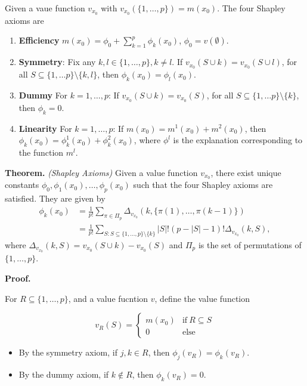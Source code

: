\documentclass[
]{book}
\providecommand{\tightlist}{%
  \setlength{\itemsep}{0pt}\setlength{\parskip}{0pt}}
\begin{document}
Given a vaue function \(v_{x_0}\) with \(v_{x_0}(\{1,\dots,p\})=m(x_0)\). The four Shapley axioms are

\begin{enumerate}
\def\labelenumi{\arabic{enumi}.}
\tightlist
\item
  \textbf{Efficiency} \(m\left(x_0\right)=\phi_{0}+\sum_{k=1}^{p} \phi_k(x_0)\), \(\phi_{0}=v(\emptyset)\).
\item
  \textbf{Symmetry}: Fix any \(k,l \in \{1,\dots,p\}, k\neq l\).
  If \(v_{x_0}(S\cup k)=v_{x_0}(S\cup l)\), for all \(S \subseteq \{1,\dots p\}\setminus \{k,l\}\), then \(\phi_k(x_0)=\phi_l(x_0).\)
\item
  \textbf{Dummy} For \(k=1,\dots,p\): If \(v_{x_0}(S\cup k)=v_{x_0}(S)\), for all \(S \subseteq \{1,\dots p\}\setminus \{k\}\), then \(\phi_k=0.\)
\item
  \textbf{Linearity} For \(k=1,\dots,p\): If \(m(x_0)=m^1(x_0)+m^2(x_0)\), then \(\phi_k(x_0)=\phi^1_k(x_0)+\phi^2_k(x_0)\), where \(\phi^l\) is the explanation corresponding to the function \(m^l\).
\end{enumerate}

\textbf{Theorem.} \emph{(Shapley Axioms)} Given a value function \(v_{x_0}\), there exist unique constants \(\phi_0,\phi_1(x_0),\dots,\phi_p(x_0)\) such that the four Shapley axioms are satisfied. They are given by
\begin{align}
\phi_{k}(x_0)&=\frac{1}{p !} \sum_{\pi \in \Pi_p} \Delta_{v_{x_0}}\left(k, \{\pi(1),\dots,\pi(k-1)\}\right)\\
&=\frac 1 {p!}\sum_{S: S \subseteq \{1,\dots,p\} \setminus\{k\}} {|S| !(p -|S|-1) !}\Delta_{v_{x_0}}(k, S),
\end{align}
where \(\Delta_{v_{x_0}}(k, S)=v_{x_0}(S \cup k)-v_{x_0}(S)\) and \(\Pi_p\) is the set of permutations of \(\{1,\dots,p\}\).

\textbf{Proof.}

For \(R\subseteq\{1,\dots,p\}\), and a value fucntion \(v\), define the value function

\[
v_R(S)=\begin{cases}m(x_0) & \text{if}\  R\subseteq S \\ 0 & \text{else} \end{cases}
\]

\begin{itemize}
\tightlist
\item
  By the symmetry axiom, if \(j,k\in R\), then \(\phi_j(v_R)=\phi_k(v_R).\)
\item
  By the dummy axiom, if \(k\notin R\), then \(\phi_k(v_R)=0\).
\end{itemize}
\end{document}
